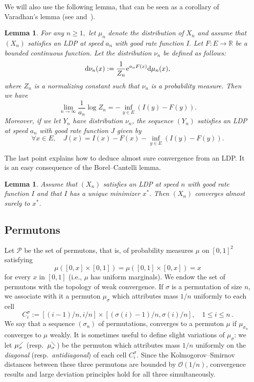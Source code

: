 \documentclass[a4paper,11pt]{amsart}
\newcommand{\ee}{\textup{e}}
\newcommand{\cO}{\mathcal O}
\newtheorem{lem}[thm]{Lemma}
\theoremstyle{definition}
\begin{document}
We will also use the following lemma, that can be seen as a corollary of Varadhan's lemma
(see \cite[Theorem 4.3.1]{dembo1998large-deviations} and~\cite[Theorem D.8]{anderson2010BookRandomMatrix}).
\begin{lem}
 \label{lem:Varadhan}
 For any $n\ge 1,$ let $\mu_n$ denote the distribution of $X_n$ and assume that $(X_n)$ satisfies an LDP at speed $a_n$ with good rate function $I.$ Let $F:E \rightarrow \mathbb R$ be a bounded continuous function. Let the distribution $\nu_n$  be defined as follows:
 \[ \mathrm{d}\nu_n(x) := \frac{1}{Z_n} \ee^{a_nF(x)} \mathrm{d}\mu_n(x),\]
 where $Z_n$ is a normalizing constant such that $\nu_n$ is a probability measure.
 Then we have
	\[ \lim_{n \rightarrow \infty} \frac{1}{a_n} \log Z_n = -  \inf_{y\in E} (I(y)- F(y)). \]
	Moreover, if we let $Y_n$ have distribution $\nu_n$,
the sequence $(Y_n)$ satisfies an LDP at speed $a_n$ with good rate function $J$
 given by
 \[ \forall x\in E, \quad J(x) = I(x) - F(x) - \inf_{y\in E} (I(y)- F(y)).\]
\end{lem}

The last point explains how to deduce almost sure convergence from an LDP. 
It is an easy consequence of the Borel--Cantelli lemma.
\begin{lem}
 \label{lem:asconvergence}
 Assume that $(X_n)$ satisfies an LDP at speed $n$ with good rate function $I$ and that $I$ has a unique minimizer $x^*.$
 Then $(X_n)$ converges almost surely to $x^*$.
\end{lem}


\subsection{Permutons}
\label{ssec:permutons}
Let $\mathcal{P}$ be the set of permutons, that is, of probability measures $\mu$ on $[0,1]^2$ satisfying
\[ \mu([0,x] \times [0,1]) =\mu([0,1] \times [0,x])=x\]
for every $x$ in $[0,1]$ (i.e., $\mu$ has uniform marginals).
We endow the set of permutons with the topology of weak convergence.
If $\sigma$ is a permutation of size $n$, we associate with it a permuton $\mu_\sigma$ which attributes mass $1/n$ uniformly to each cell 
\[
    C_{i}^\sigma := [(i-1)/n, i/n]  \times \left[ (\sigma(i)-1) / n, \sigma(i)/n \right]  ,
    \quad 1\le i\le n \,.
\]
We say that a sequence $(\sigma_n)$ of permutations, converges to a permuton $\mu$ if $\mu_{\sigma_n}$ converges to $\mu$ weakly.
It is sometimes useful to define slight variations of $\mu_\sigma$:
we let $\mu_\sigma^\diagup$ (resp.~$\mu_\sigma^\diagdown$) be the permuton which attributes mass $1/n$ uniformly on the \emph{diagonal} (resp.~\emph{antidiagonal}) of each cell $C_{i}^\sigma$.
Since the Kolmogorov--Smirnov distances between these three permutons are bounded by $\cO(1/n)$, convergence results and large deviation principles hold for all three simultaneously.
\end{document}
